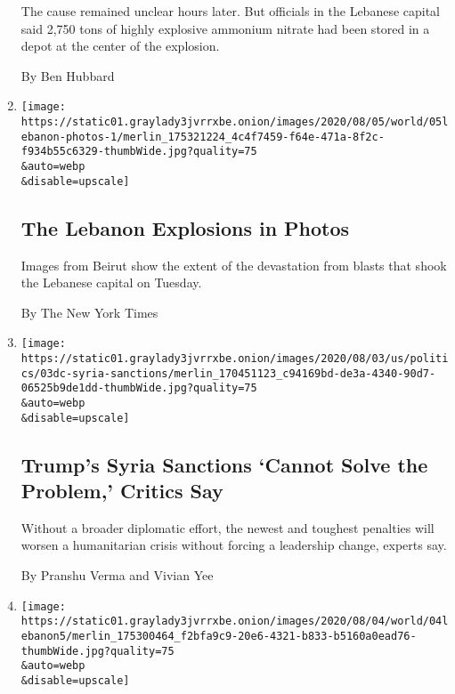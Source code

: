 \begin{enumerate}
  The cause remained unclear hours later. But officials in the Lebanese
  capital said 2,750 tons of highly explosive ammonium nitrate had been
  stored in a depot at the center of the explosion.

  By Ben Hubbard
\item
  \href{/2020/08/04/world/middleeast/beirut-lebanon-explosions-photos.html}{}

  \texttt{[image: https://static01.graylady3jvrrxbe.onion/images/2020/08/05/world/05lebanon-photos-1/merlin\_175321224\_4c4f7459-f64e-471a-8f2c-f934b55c6329-thumbWide.jpg?quality=75\\\&auto=webp\\\&disable=upscale]}

  \hypertarget{the-lebanon-explosions-in-photos}{%
  \subsection{The Lebanon Explosions in
  Photos}\label{the-lebanon-explosions-in-photos}}

  Images from Beirut show the extent of the devastation from blasts that
  shook the Lebanese capital on Tuesday.

  By The New York Times
\item
  \href{/2020/08/04/world/middleeast/trump-assad-syria-sanctions.html}{}

  \texttt{[image: https://static01.graylady3jvrrxbe.onion/images/2020/08/03/us/politics/03dc-syria-sanctions/merlin\_170451123\_c94169bd-de3a-4340-90d7-06525b9de1dd-thumbWide.jpg?quality=75\\\&auto=webp\\\&disable=upscale]}

  \hypertarget{trumps-syria-sanctions-cannot-solve-the-problem-critics-say}{%
  \subsection{Trump's Syria Sanctions `Cannot Solve the Problem,'
  Critics
  Say}\label{trumps-syria-sanctions-cannot-solve-the-problem-critics-say}}

  Without a broader diplomatic effort, the newest and toughest penalties
  will worsen a humanitarian crisis without forcing a leadership change,
  experts say.

  By Pranshu Verma and Vivian Yee
\item
  \href{/2020/08/04/world/middleeast/beirut-explosion-blast.html}{}

  \texttt{[image: https://static01.graylady3jvrrxbe.onion/images/2020/08/04/world/04lebanon5/merlin\_175300464\_f2bfa9c9-20e6-4321-b833-b5160a0ead76-thumbWide.jpg?quality=75\\\&auto=webp\\\&disable=upscale]}


\end{enumerate}
